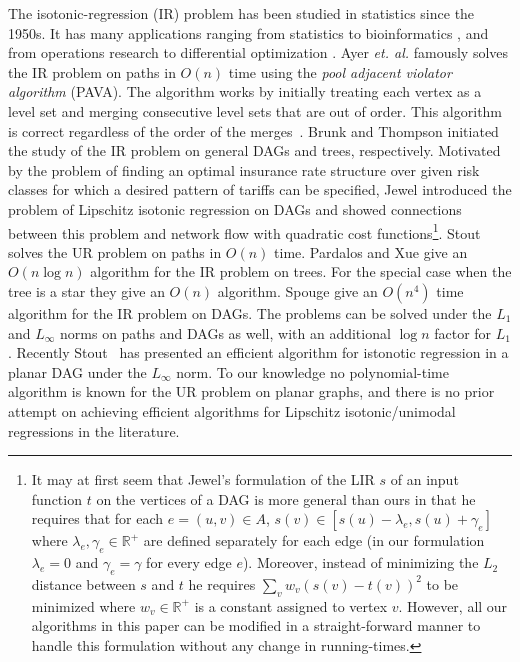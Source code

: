\documentclass[11pt]{article}
\newcommand{\ir}{IR }
\newcommand{\ur}{UR }
\begin{document}
The isotonic-regression (IR)  problem has been studied in 
statistics \cite{ABERS55,BBBB72,Preparata:85} since the 1950s.  It has many applications ranging from 
statistics \cite{Sto00} to bioinformatics \cite{BBBB72}, and from operations 
research \cite{MM85}  to differential optimization \cite{GW84}.  
Ayer \emph{et. al.} \cite{ABERS55} famously solves the \ir problem on 
paths in $O(n)$ time using the 
\emph{pool adjacent violator algorithm} (PAVA).  The algorithm 
works by initially treating each vertex as a level set and merging consecutive level sets that are out of order.  This algorithm is correct regardless of the order of the merges~\cite{RWD88}.  
Brunk \cite{Bru55} and Thompson \cite{Tho62} initiated the study of the \ir problem on general DAGs and trees, respectively.
Motivated by the problem of finding an optimal insurance rate structure over given risk classes for which a desired pattern of tariffs can be specified, Jewel \cite{Jewel:75} introduced the problem of Lipschitz isotonic regression on DAGs and showed connections between this problem and network flow with quadratic cost functions\footnote{It may at first seem that Jewel's formulation of the LIR $s$ of an input function $t$ on the vertices of a DAG is more general than ours in that he requires that for each $e = (u,v)\in A$, $s(v) \in [s(u) - \lambda_e, s(u)+\gamma_e]$ where $\lambda_e, \gamma_e \in \mathbb{R}^+$ are defined separately for each edge (in our formulation $\lambda_e = 0$ and $\gamma_e = \gamma$ for every edge $e$). Moreover, instead of minimizing the $L_2$ distance between $s$ and $t$ he requires $\sum_{v} w_v(s(v) - t(v))^2$ to be minimized where $w_v \in \mathbb{R}^+$ is a constant assigned to vertex $v$. However,  all our algorithms in this paper can be modified in a straight-forward manner to handle this formulation without any change in running-times.}.
Stout \cite{Sto08} solves the \ur problem on paths in $O(n)$ time.
Pardalos and Xue \cite{PX99} give an $O(n \log n)$ algorithm for the \ir problem on trees.  
For the special case when the tree is a star they give an $O(n)$ algorithm.  
Spouge \etal \cite{SWW03} give an $O(n^4)$ time algorithm for the \ir problem on DAGs.  
The problems can be solved under the $L_1$ and $L_{\infty}$ norms on 
paths \cite{Sto08} and DAGs \cite{AHKW06} as well, with an 
additional $\log n$ factor for $L_1$. Recently Stout~\cite{Stout:08} has
presented an efficient algorithm for istonotic regression in a planar
DAG under the $L_{\infty}$ norm. To our knowledge no polynomial-time algorithm is known for the 
UR problem on planar graphs, and there is no prior attempt on achieving efficient algorithms for  
Lipschitz isotonic/unimodal regressions in the literature. 
\end{document}

